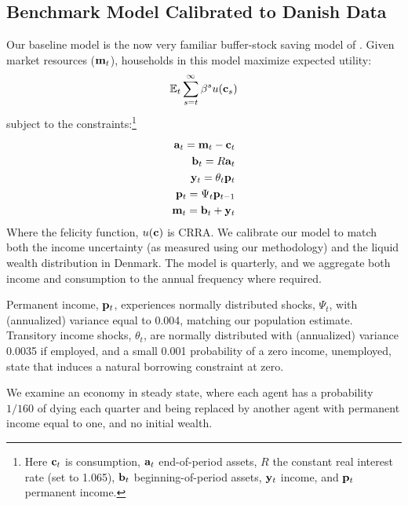 \documentclass[titlepage]{\econtex}\newcommand{\texname}{ConsumptionHeterogeneity}
\begin{document}
\subsection{Benchmark Model Calibrated to Danish Data} \label{benchmark_model}
Our baseline model is the now very familiar buffer-stock saving model of \cite{carroll_buffer_1997}. Given market resources ($\boldmath{\ensuremath{\mathbf{m}}}_t$), households in this model maximize expected utility:
\begin{align*}
	\mathbb{E}_t \sum_{s=t}^{\infty} \beta^s u(\mathbf{c}_s)
\end{align*}
subject to the constraints:\footnote{Here $\mathbf{c}_t$ is consumption, $\mathbf{a}_t$ end-of-period assets, $R$ the constant real interest rate (set to 1.065), $\mathbf{b}_t$ beginning-of-period assets, $\mathbf{y}_t$ income, and $\mathbf{p}_t$ permanent income.}
\begin{align*}
	\mathbf{a}_t = \mathbf{m}_t - \mathbf{c}_t \\
	\mathbf{b}_t = R\mathbf{a}_t \\
	\mathbf{y}_t = \theta_t \mathbf{p}_t \\
	\mathbf{p}_t = \Psi_t \mathbf{p}_{t-1} \\
	\mathbf{m}_t = \mathbf{b}_t + \mathbf{y}_t
\end{align*}
Where the felicity function, $u(\mathbf{c})$ is CRRA. We calibrate our model to match both the income uncertainty (as measured using our methodology) and the liquid wealth distribution in Denmark. The model is quarterly, and we aggregate both income and consumption to the annual frequency where required.

Permanent income, $\mathbf{p}_t$, experiences normally distributed shocks, $\Psi_t$, with (annualized) variance equal to 0.004, matching our population estimate. Transitory income shocks, $\theta_t$, are normally distributed with (annualized) variance 0.0035 if employed, and a small 0.001 probability of a zero income, unemployed, state that induces a natural borrowing constraint at zero.

We examine an economy in steady state, where each agent has a probability $1/160$ of dying each quarter and being replaced by another agent with permanent income equal to one, and no initial wealth.
\end{document}
